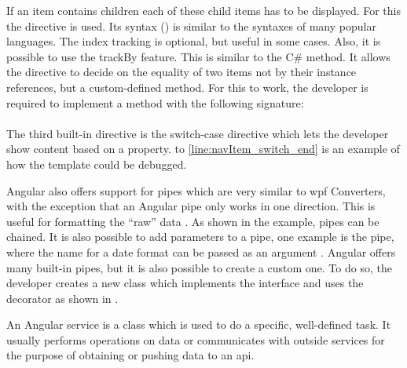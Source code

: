 If an item contains children each of these child items has to be displayed. For this the  directive is used. Its syntax () is similar to the  syntaxes of many popular languages. The index tracking is optional, but useful in some cases. Also, it is possible to use the trackBy feature. This is similar to the  C\# method. It allows the  directive to decide on the equality of two items not by their instance references, but a custom-defined method. For this to work, the developer is required to implement a method with the following signature:\\
\\

The third built-in directive is the switch-case directive which lets the developer show content based on a property.  to \ref{line:navItem_switch_end} is an example of how the  template could be debugged.


Angular also offers support for pipes which are very similar to \gls{wpf} Converters, with the exception that an Angular pipe only works in one direction. This is useful for formatting the \enquote{raw} data \zB {}. As shown in the example, pipes can be chained. It is also possible to add parameters to a pipe, one example is the  pipe, where the name for a date format can be passed as an argument \zB {}. Angular offers many built-in pipes, but it is also possible to create a custom one. To do so, the developer creates a new class which implements the  interface and uses the  decorator as shown in .


\cite{angularTemplateSyntax}




An Angular service is a class which is used to do a specific, well-defined task. It usually performs operations on data or communicates with outside services for the purpose of obtaining or pushing data to an \gls{api}.

